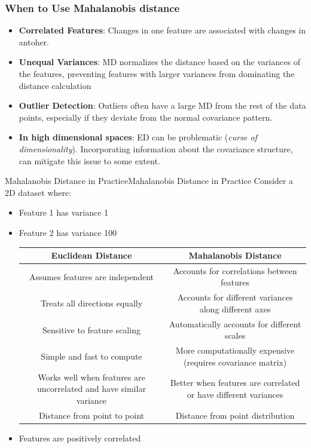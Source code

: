 \documentclass[a4paper]{article}
\theoremstyle{definition}
\begin{document}
\subsubsection{When to Use Mahalanobis distance}
\begin{itemize}
    \item \textbf{Correlated Features}: Changes in one feature are associated with changes in antoher.
    \item \textbf{Unequal Variances}: MD normalizes the distance based on the variances of the features, 
        preventing features with larger variances from dominating the distance calculation 
    \item \textbf{Outlier Detection}: Outliers often have a large MD from the rest of the data points, 
        especially if they deviate from the normal covariance pattern.
    \item \textbf{In high dimensional spaces}: ED can be problematic (\textit{curse of dimensionality}). Incorporating 
        information about the covariance structure, can mitigate this issue to some extent.
\end{itemize}
\begin{example}{Mahalanobis Distance in Practice}{Mahalanobis Distance in Practice}
Consider a 2D dataset where:
\begin{itemize}
    \item Feature 1 has variance 1 
    \item Feature 2 has variance 100
    \begin{center}
        \begin{tabular}{ |c|c| }
            \hline 
            \textbf{Euclidean Distance} & \textbf{Mahalanobis Distance} \\
            \hline 
            Assumes features are independent & Accounts for correlations between features \\
            \hline 
            Treats all directions equally & Accounts for different variances along different axes \\
            \hline 
            Sensitive to feature scaling & Automatically accounts for different scales \\
            \hline
            Simple and fast to compute & More computationally expensive (requires covariance matrix) \\
            \hline 
            Works well when features are uncorrelated and have similar variance & Better when features are correlated or have different variances \\
            \hline 
            Distance from point to point & Distance from point distribution \\
            \hline
        \end{tabular}
    \end{center}
    \item Features are positively correlated
\end{itemize}
\end{example}
\end{document}
